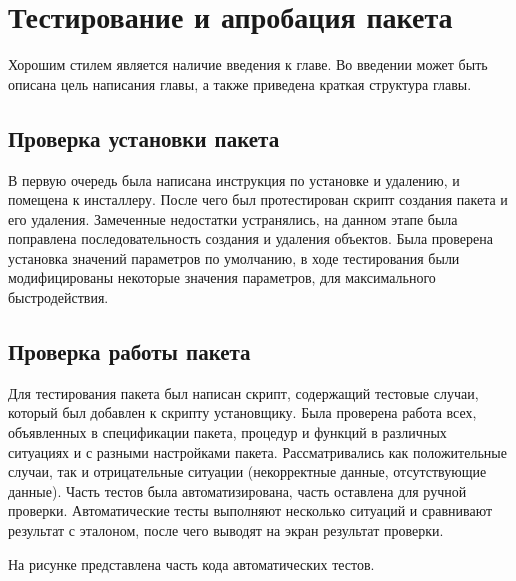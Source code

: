 \chapter{Тестирование и апробация пакета} \label{ch4}


Хорошим стилем является наличие введения к главе. Во введении может быть описана цель написания главы, а также приведена краткая структура главы. 
	
\section{Проверка установки пакета} \label{ch4:sec}

В первую очередь была написана инструкция по установке и удалению, и помещена к инсталлеру. После чего был протестирован скрипт создания пакета и его удаления. Замеченные недостатки устранялись, на данном этапе была поправлена последовательность создания и удаления объектов. Была проверена установка значений параметров по умолчанию, в ходе тестирования были модифицированы некоторые значения параметров, для максимального быстродействия. 

\section{Проверка работы пакета} \label{ch4:sec2}

Для тестирования пакета был написан скрипт, содержащий тестовые случаи, который был добавлен к скрипту установщику. Была проверена работа всех, объявленных в спецификации пакета, процедур и функций в различных ситуациях и с разными настройками пакета. Рассматривались как положительные случаи, так и отрицательные ситуации (некорректные данные, отсутствующие данные). Часть тестов была автоматизирована, часть оставлена для ручной проверки. Автоматические тесты выполняют несколько ситуаций и сравнивают результат с эталоном, после чего выводят на экран результат проверки. 

На рисунке  представлена часть кода автоматических тестов. 

